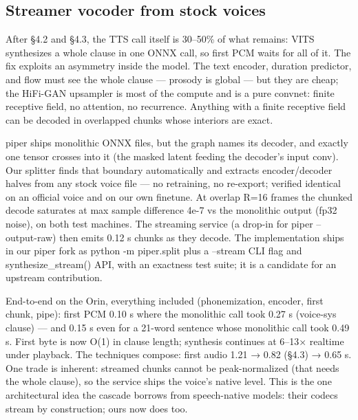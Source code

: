 \documentclass[journal]{IEEEtran}
\begin{document}
\subsection{Streamer vocoder from stock voices}

After §4.2 and §4.3, the TTS call itself is 30–50\% of what remains: VITS synthesizes a whole clause in one ONNX call, so first PCM waits for all of it. The fix exploits an asymmetry inside the model. The text encoder, duration predictor, and flow must see the whole clause — prosody is global — but they are cheap; the HiFi-GAN upsampler is most of the compute and is a pure convnet: finite receptive field, no attention, no recurrence. Anything with a finite receptive field can be decoded in overlapped chunks whose interiors are exact.

piper ships monolithic ONNX files, but the graph names its decoder, and exactly one tensor crosses into it (the masked latent feeding the decoder's input conv). Our splitter finds that boundary automatically and extracts encoder/decoder halves from any stock voice file — no retraining, no re-export; verified identical on an official voice and on our own finetune. At overlap R=16 frames the chunked decode saturates at max sample difference 4e-7 vs the monolithic output (fp32 noise), on both test machines. The streaming service (a drop-in for piper --output-raw) then emits 0.12 s chunks as they decode. The implementation ships in our piper fork as python -m piper.split plus a --stream CLI flag and synthesize\_stream() API, with an exactness test suite; it is a candidate for an upstream contribution.

End-to-end on the Orin, everything included (phonemization, encoder, first chunk, pipe): first PCM 0.10 s where the monolithic call took 0.27 s (voice-sys clause) — and 0.15 s even for a 21-word sentence whose monolithic call took 0.49 s. First byte is now O(1) in clause length; synthesis continues at 6–13× realtime under playback. The techniques compose: first audio 1.21 → 0.82 (§4.3) → 0.65 s. One trade is inherent: streamed chunks cannot be peak-normalized (that needs the whole clause), so the service ships the voice's native level. This is the one architectural idea the cascade borrows from speech-native models: their codecs stream by construction; ours now does too.
\end{document}
